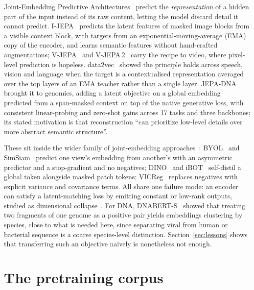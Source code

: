 \documentclass[10pt,twocolumn,a4paper]{article}
\begin{document}
Joint-Embedding Predictive Architectures~\cite{lecun2022path} predict the
\emph{representation} of a hidden part of the input instead of its raw content,
letting the model discard detail it cannot predict.
I-JEPA~\cite{assran2023ijepa} predicts the latent features of masked image blocks
from a visible context block, with targets from an exponential-moving-average
(EMA) copy of the encoder, and learns semantic features without hand-crafted
augmentations; V-JEPA~\cite{bardes2024vjepa} and
V-JEPA\,2~\cite{assran2025vjepa2} carry the recipe to video, where pixel-level
prediction is hopeless. data2vec~\cite{baevski2022data2vec} showed the principle
holds across speech, vision and language when the target is a contextualised
representation averaged over the top layers of an EMA teacher rather than a
single layer. JEPA-DNA~\cite{larey2026jepadna} brought it to genomics, adding a
latent objective on a global embedding predicted from a span-masked context on
top of the native generative loss, with consistent linear-probing and zero-shot
gains across 17 tasks and three backbones; its stated motivation is that
reconstruction ``can prioritize low-level details over more abstract semantic
structure''.

These sit inside the wider family of joint-embedding
approaches~\cite{balestriero2023cookbook}: BYOL~\cite{grill2020byol} and
SimSiam~\cite{chen2021simsiam} predict one view's embedding from another's with
an asymmetric predictor and a stop-gradient and no negatives;
DINO~\cite{caron2021dino} and iBOT~\cite{zhou2022ibot} self-distil a global token
alongside masked patch tokens; VICReg~\cite{bardes2022vicreg} replaces negatives
with explicit variance and covariance terms. All share one failure mode: an
encoder can satisfy a latent-matching loss by emitting constant or low-rank
outputs, studied as dimensional
collapse~\cite{jing2022dimensional,tian2021understanding}. For DNA,
DNABERT-S~\cite{zhou2024dnaberts} showed that treating two fragments of one
genome as a positive pair yields embeddings clustering by species, close to what
is needed here, since separating viral from human or bacterial sequence is a
coarse species-level distinction. Section~\ref{sec:lessons} shows that
transferring such an objective naively is nonetheless not enough.

\section{The pretraining corpus}\label{sec:corpus}
\end{document}
